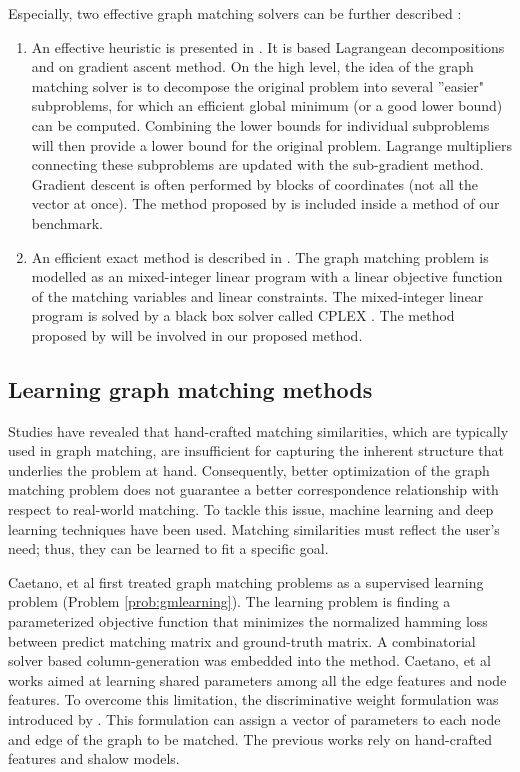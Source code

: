 \documentclass[times,onecolumn,final,authoryear]{article}
\theoremstyle{definition}
\begin{document}
 Especially, two effective graph matching solvers can be further described : 
 \begin{enumerate}
     \item An effective heuristic is presented in \cite{DBLP:journals/corr/SwobodaRAKS16}. It is based Lagrangean decompositions and on gradient ascent method.  On the high level, the idea of the graph matching solver is to decompose the original problem into several ''easier" subproblems, for which an efficient global minimum (or a good lower bound) can be computed. Combining the lower bounds for individual subproblems will then provide a lower bound for the original problem. Lagrange multipliers connecting these subproblems are updated with the sub-gradient method. Gradient descent is often performed by blocks of coordinates (not all the vector at once). The method  proposed by \cite{DBLP:journals/corr/SwobodaRAKS16} is included inside a method of our benchmark. 
     \item An efficient exact method is described in \cite{Lerouge2017NewBL}. The graph matching problem is modelled as an mixed-integer linear program with a
    linear objective function of the matching variables and linear constraints. The mixed-integer linear program is solved by a black box solver called CPLEX \cite{cplex2009v12}. The method proposed by \cite{Lerouge2017NewBL} will be involved in our proposed method.
 \end{enumerate}
 
\subsection{Learning graph matching methods}
Studies \cite{caetano2009learning,cho2013learning} have revealed that hand-crafted matching similarities, which are typically used in graph matching, are insufficient for capturing the inherent structure that underlies the problem at hand. Consequently, better optimization of the graph matching problem does not guarantee a better correspondence relationship with respect to real-world matching. To tackle this issue, machine learning and deep learning techniques have been used. Matching similarities must reflect the user's need; thus, they can be learned to fit a specific goal.

Caetano, et al \cite{caetano2009learning} first treated graph matching problems as a supervised learning problem (Problem \ref{prob:gmlearning}). The learning problem is finding a parameterized objective function that minimizes the normalized hamming loss between predict matching matrix and ground-truth matrix. A combinatorial solver based column-generation was embedded into the method. Caetano, et al works aimed at learning shared parameters among all the edge features and node features. To overcome this limitation, the discriminative weight formulation was introduced by \cite{cho2013learning}. This formulation can assign a vector of parameters to each node and edge of the graph to be matched. The previous works \cite{caetano2009learning,cho2013learning} rely on hand-crafted features and shalow models.
\end{document}

